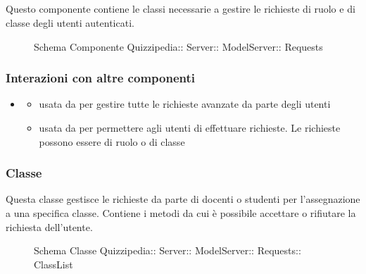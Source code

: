 \subsection{}
Questo componente contiene le classi necessarie a gestire le richieste di ruolo e di classe degli utenti autenticati.
\begin{figure}[H]
\centering
\noindent{}
\caption[Schema Componente Requests]{Schema Componente Quizzipedia:: Server:: ModelServer:: Requests}
\end{figure}
\subsubsection{Interazioni con altre componenti}
\begin{itemize}
\item {}
\begin{itemize}
\item usata da  per gestire tutte le richieste avanzate da parte degli utenti
\item usata da  per permettere agli utenti di effettuare richieste. Le richieste possono essere di ruolo o di classe
\end{itemize}
\end{itemize}
\subsubsection{Classe }
Questa classe gestisce le richieste da parte di docenti o studenti per l'assegnazione a una specifica classe. Contiene i metodi da cui è possibile accettare o rifiutare la richiesta dell'utente.
\begin{figure}[H]
\centering
\noindent{}
\caption[Schema Classe ClassList]{Schema Classe Quizzipedia:: Server:: ModelServer:: Requests:: ClassList}
\end{figure}
